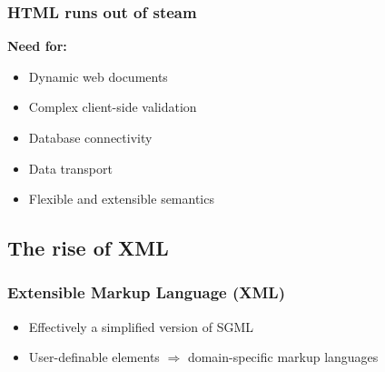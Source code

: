 \usebackgroundtemplate{}





\frame
{
	\frametitle{HTML runs out of steam}
	
	\textbf{Need for:}
	
	\begin{itemize}
	
		\item Dynamic web documents
		
		
		\item Complex client-side validation
		
		
		\item Database connectivity
		
		\item Data transport
		
		\item Flexible and extensible semantics
		
	\end{itemize}

}

\usebackgroundtemplate{}




\subsection*{The rise of XML}




\frame
{
	\frametitle{Extensible Markup Language (XML)}
	
	\begin{itemize}
	
		\item Effectively a simplified version of SGML
		
		\item User-definable elements \(\Rightarrow\) domain-specific
		markup languages
		
	\end{itemize}

}


